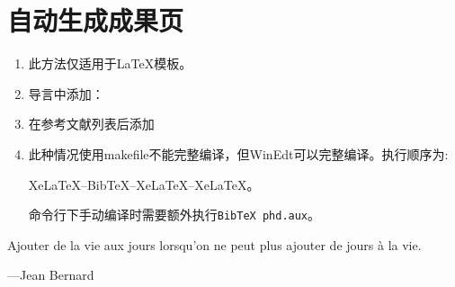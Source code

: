 \documentclass[twoside,longtitle]{LZUthesis}
\begin{document}
\section{自动生成成果页}
\begin{enumerate}
\item 此方法仅适用于\LaTeX{}模板。
\item 导言中添加：



\item 在参考文献列表后添加



\item 此种情况使用makefile不能完整编译，但WinEdt可以完整编译。执行顺序为:


Xe\LaTeX{}--Bib\TeX{}--Xe\LaTeX{}--Xe\LaTeX{}。


命令行下手动编译时需要额外执行\lstinline!BibTeX phd.aux!。

\end{enumerate}



\appendix





\begin{thanks}
Ajouter de la vie aux jours lorsqu'on ne peut plus ajouter de jours
à la vie.

\begin{flushright}
---Jean Bernard
\par\end{flushright}
\end{thanks}
\end{document}
